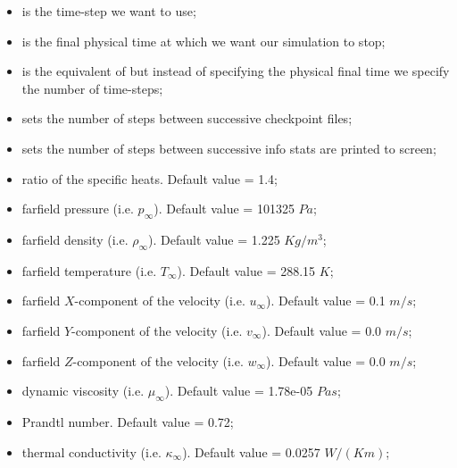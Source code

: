 \begin{itemize}
\item {} is the time-step we want to use;
\item {} is the final physical time at which we want our simulation to stop;
\item {} is the equivalent of  but instead of specifying the 
physical final time we specify the number of time-steps;
\item {} sets the number of steps between successive checkpoint files;
\item {} sets the number of steps between successive info stats are printed 
to screen;
\item {} ratio of the specific heats. Default value = 1.4;
\item {} farfield pressure (i.e. $p_{\infty}$). Default value = 101325 $Pa$;
\item {} farfield density (i.e. $\rho_{\infty}$). Default value = 1.225 $Kg/m^{3}$;
\item {} farfield temperature (i.e. $T_{\infty}$). Default value = 288.15 $K$;
\item {} farfield $X$-component of the velocity (i.e. $u_{\infty}$). Default value = 0.1 $m/s$;
\item {} farfield $Y$-component of the velocity (i.e. $v_{\infty}$). Default value = 0.0 $m/s$;
\item {} farfield $Z$-component of the velocity (i.e. $w_{\infty}$). Default value = 0.0 $m/s$;
\item {} dynamic viscosity (i.e. $\mu_{\infty}$). Default value = 1.78e-05 $Pa s$;
\item {} Prandtl number. Default value = 0.72;
\item {} thermal conductivity (i.e. $\kappa_{\infty}$). Default value = 0.0257 $W / (K m)$;
\end{itemize}

